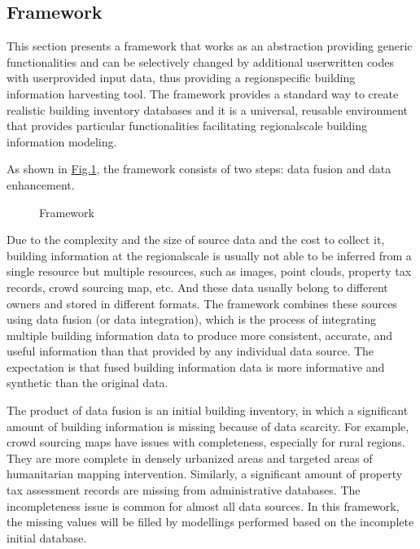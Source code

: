 \documentclass[letterpaper,10pt,english]{sphinxmanual}
\begin{document}
\subsection{Framework}
\label{\detokenize{common/technical_manual/framework:framework}}\label{\detokenize{common/technical_manual/framework:lbl-framework}}\label{\detokenize{common/technical_manual/framework::doc}}
\sphinxAtStartPar
This section presents a framework that works as an abstraction providing generic functionalities and can be selectively
changed by additional user\sphinxhyphen{}written codes with user\sphinxhyphen{}provided input data,
thus providing a region\sphinxhyphen{}specific building information harvesting tool.
The framework provides a standard way to create realistic building inventory databases and it is a universal, reusable environment that provides particular functionalities facilitating regional\sphinxhyphen{}scale building information modeling.

\sphinxAtStartPar
As shown in \hyperref[\detokenize{common/technical_manual/framework:brailspipeline}]{Fig.\@ \ref{\detokenize{common/technical_manual/framework:brailspipeline}}}, the framework consists of two steps: data fusion and data enhancement.

\begin{figure}[htbp]
\centering
\capstart

\noindent{}
\caption{Framework}\label{\detokenize{common/technical_manual/framework:id12}}\label{\detokenize{common/technical_manual/framework:brailspipeline}}\end{figure}

\sphinxAtStartPar
Due to the complexity and the size of source data and the cost to collect it,
building information at the regional\sphinxhyphen{}scale is usually not able to be inferred
from a single resource but multiple resources, such as images, point clouds,
property tax records, crowd sourcing map, etc. And these data usually belong
to different owners and stored in different formats.
The framework combines these sources using data fusion (or data integration),
which is the process of integrating multiple building information data to produce
more consistent, accurate, and useful information than that provided by any
individual data source.
The expectation is that fused building information data is more informative
and synthetic than the original data.

\sphinxAtStartPar
The product of data fusion is an initial building inventory,
in which a significant amount of building information is missing because of data scarcity.
For example, crowd sourcing maps have issues with completeness, especially for rural regions.
They are more complete in densely urbanized areas and targeted areas of humanitarian
mapping intervention. Similarly, a significant amount of property tax assessment
records are missing from administrative databases. The incompleteness issue is
common for almost all data sources. In this framework, the missing values will
be filled by modellings performed based on the incomplete initial database.
\end{document}
